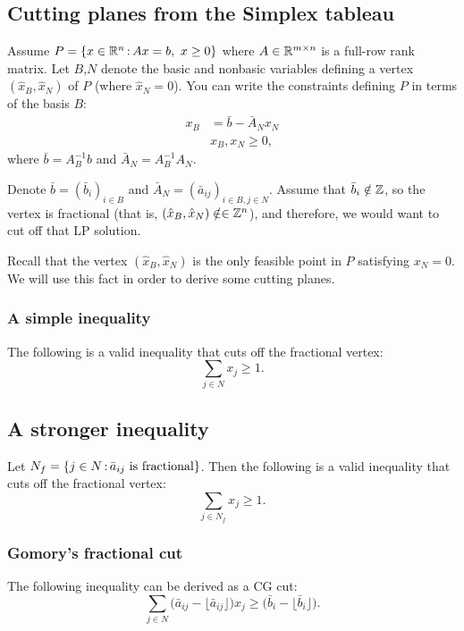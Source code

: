 \documentclass[../open-optimization/open-optimization.tex]{subfiles}
\begin{document}
\subsection{Cutting planes from the Simplex tableau}
Assume $P=\{x\in\R^n\tq Ax=b,\ x\geq0\}$ where $A\in{\mathbb{R}}^{m\times n}$ is a full-row rank matrix. Let $B$,$N$ denote the basic and nonbasic variables defining a vertex $(\hat x_B,\hat x_N)$ of $P$ (where $\hat x_N=0$). You can write the constraints defining $P$ in terms of the basis $B$:
\begin{align*}
x_B&=\bar b -\bar A_N x_N\\
&x_B,x_N\geq0,
\end{align*}
where $\bar b=A_B^{-1}b$ and $\bar A_N=A_B^{-1}A_N$. 

\vspace{0.2cm}

Denote $\bar b=(\bar b_i)_{i\in B}$ and  $\bar A_N=(\bar a_{ij})_{i\in B, j\in N}$. Assume that $\bar b_i\notin {\mathbb{Z}}$, so the vertex is fractional \big(that is, $(\hat x_B,\hat x_N)\notin \in {\mathbb{Z}}^n$\big), and therefore, we would want to cut off that LP solution.

\begin{remark} Recall that the vertex $(\hat x_B,\hat x_N)$ is the only feasible point in $P$ satisfying $x_N=0$. We will use this fact in order to derive some cutting planes.
\end{remark}

\subsubsection{A simple inequality}
The following is a valid inequality that cuts off the fractional vertex:
$$\sum_{j\in N}x_j\geq 1.$$
\subsection{A stronger inequality}
Let $N_f=\{j\in N{\,:\,} \bar a_{ij}\ \text{is fractional}\}$. Then the following is a valid inequality that cuts off the fractional vertex:
$$\sum_{j\in N_f}x_j\geq 1.$$
\subsubsection{Gomory's fractional cut}
The following inequality can be derived as a CG cut:
$$\sum_{j\in N}\big(\bar a_{ij}-\lfloor \bar a_{ij} \rfloor \big)x_j\geq (\bar b_{i}-\lfloor \bar b_{i} \rfloor \big).$$
\end{document}
